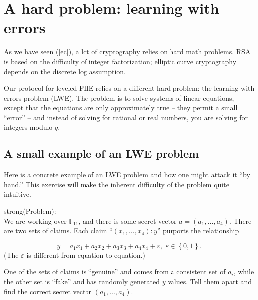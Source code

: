 \section{A hard problem: learning with errors}\label{lwe}

As we have seen ({[}ec{]}), a lot of cryptography relies on hard math
problems. RSA is based on the difficulty of integer factorization;
elliptic curve cryptography depends on the discrete log assumption.

Our protocol for leveled FHE relies on a different hard problem: the
learning with errors problem (LWE). The problem is to solve systems of
linear equations, except that the equations are only approximately true
-- they permit a small ``error'' -- and instead of solving for rational
or real numbers, you are solving for integers modulo \(q\).

\subsection{A small example of an LWE problem}\label{lwe-small}

Here is a concrete example of an LWE problem and how one might attack it
``by hand.'' This exercise will make the inherent difficulty of the
problem quite intuitive.

strong(Problem):\\
We are working over \(\mathbb{F}_{11}\), and there is some secret vector
\(a = \left( a_{1},\ldots,a_{4} \right)\). There are two sets of claims.
Each claim ``\(\left( x_{1},\ldots,x_{4} \right):y\)'' purports the
relationship

\[y = a_{1}x_{1} + a_{2}x_{2} + a_{3}x_{3} + a_{4}x_{4} + \varepsilon,\mspace{6mu}\varepsilon \in \left\{ 0,1 \right\}.\]
(The \(\varepsilon\) is different from equation to equation.)

One of the sets of claims is ``genuine'' and comes from a consistent set
of \(a_{i}\), while the other set is ``fake'' and has randomly generated
\(y\) values. Tell them apart and find the correct secret vector
\(\left( a_{1},\ldots,a_{4} \right)\).


